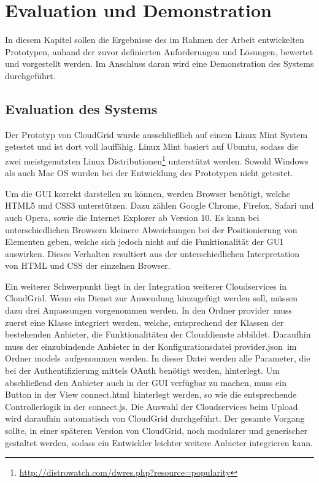 \chapter{Evaluation und Demonstration}
In diesem Kapitel sollen die Ergebnisse des im Rahmen der Arbeit entwickelten Prototypen, anhand der zuvor definierten Anforderungen und Lösungen, bewertet und vorgestellt werden.
Im Anschluss daran wird eine Demonstration des Systems durchgeführt.

\section{Evaluation des Systems}
\label{evaluation-des-system}
Der Prototyp von CloudGrid wurde ausschließlich auf einem Linux Mint System getestet und ist dort voll lauffähig.
Linux Mint basiert auf Ubuntu, sodass die zwei meistgenutzten Linux Distributionen\footnote{\url{http://distrowatch.com/dwres.php?resource=popularity}} unterstützt werden.
Sowohl Windows als auch Mac OS wurden bei der Entwicklung des Prototypen nicht getestet.

Um die GUI korrekt darstellen zu können, werden Browser benötigt, welche HTML5 und CSS3 unterstützen.
Dazu zählen Google Chrome, Firefox, Safari und auch Opera, sowie die Internet Explorer ab Version 10.
Es kann bei unterschiedlichen Browsern kleinere Abweichungen bei der Positionierung von Elementen geben, welche sich jedoch nicht auf die Funktionalität der GUI auswirken.
Dieses Verhalten resultiert aus der unterschiedlichen Interpretation von \ac{HTML} und \ac{CSS} der einzelnen Browser.

Ein weiterer Schwerpunkt liegt in der Integration weiterer Cloudservices in CloudGrid.
Wenn ein Dienst zur Anwendung hinzugefügt werden soll, müssen dazu drei Anpassungen vorgenommen werden.
In den Ordner \frqq provider\flqq\ muss zuerst eine Klasse integriert werden, welche, entsprechend der Klassen der bestehenden Anbieter, die Funktionalitäten der Clouddienste abbildet.
Daraufhin muss der einzubindende Anbieter in der Konfigurationsdatei \frqq provider.json\flqq\ im Ordner \frqq models\flqq\ aufgenommen werden.
In dieser Datei werden alle Parameter, die bei der Authentifizierung mittels OAuth benötigt werden, hinterlegt.
Um abschließend den Anbieter auch in der \ac{GUI} verfügbar zu machen, muss ein Button in der View \frqq connect.html\flqq\ hinterlegt werden, so wie die entsprechende Controllerlogik in der \frqq connect.js\flqq .
Die Auswahl der Cloudservices beim Upload wird daraufhin automatisch von CloudGrid durchgeführt.
Der gesamte Vorgang sollte, in einer späteren Version von CloudGrid, noch modularer und generischer gestaltet werden, sodass ein Entwickler leichter weitere Anbieter integrieren kann.

